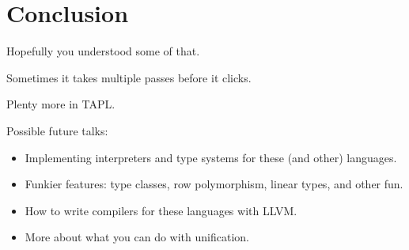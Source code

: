 
\section{Conclusion}

\begin{frame}
  Hopefully you understood some of that.
\end{frame}

\begin{frame}
  Sometimes it takes multiple passes before it clicks.
\end{frame}

\begin{frame}
  Plenty more in TAPL.
\end{frame}

\begin{frame}
  Possible future talks:
  \begin{itemize}
    \pause
  \item <+-> Implementing interpreters and type systems for these (and other) languages.
  \item <+-> Funkier features: type classes, row polymorphism, linear types, and other fun.
  \item <+-> How to write compilers for these languages with LLVM.
  \item <+-> More about what you can do with unification.
  \end{itemize}
\end{frame}